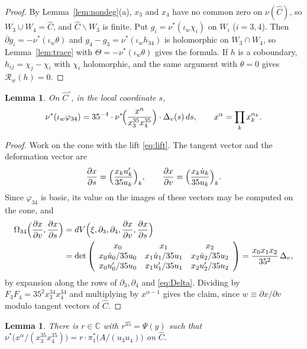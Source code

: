 \documentclass[11pt]{amsart}
\newtheorem{lemma}[theorem]{Lemma}
\theoremstyle{definition}
\theoremstyle{remark}
\numberwithin{equation}{section}
\newcommand{\C}{\mathbb{C}}
\newcommand{\cR}{\mathcal{R}}
\newcommand{\Ob}{\overline{\partial}}
\newcommand{\sm}{\smallsetminus}
\begin{document}
\begin{proof}
By Lemma~\ref{lem:nondeg}(a), $x_3$ and $x_4$ have no common zero on $\nu(\widehat C)$, so $W_3\cup W_4=\widehat C$, and $\widehat C\sm W_3$ is finite. Put $g_i=\nu^*(\iota_w\chi_i)$ on $W_i$ ($i=3,4$). Then $\Ob g_i=-\nu^*(\iota_w\theta)$ and $g_4-g_3=\nu^*(\iota_wh_{34})$ is holomorphic on $W_3\cap W_4$, so Lemma~\ref{lem:trace} with $\Theta=-\nu^*(\iota_w\theta)$ gives the formula. If $h$ is a coboundary, $h_{ij}=\chi_j-\chi_i$ with $\chi_i$ holomorphic, and the same argument with $\theta=0$ gives $\cR_w(h)=0$.
\end{proof}

\begin{lemma}\label{lem:contraction}
On $\widehat C^\circ$, in the local coordinate $s$,
\[
\nu^*(\iota_w\varphi_{34})=35^{-4}\cdot\nu^*\!\Bigl(\frac{x^\alpha}{x_3^{35}x_4^{35}}\Bigr)\cdot\Delta_v(s)\,ds,\qquad x^\alpha=\prod_kx_k^{\alpha_k}.
\]
\end{lemma}

\begin{proof}
Work on the cone with the lift \eqref{eq:lift}. The tangent vector and the deformation vector are
\[
\frac{\partial x}{\partial s}=\Bigl(\frac{x_ku_k'}{35u_k}\Bigr)_k,\qquad \frac{\partial x}{\partial v}=\Bigl(\frac{x_k\dot u_k}{35u_k}\Bigr)_k .
\]
Since $\varphi_{34}$ is basic, its value on the images of these vectors may be computed on the cone, and
\begin{align*}
\Omega_{34}\Bigl(\frac{\partial x}{\partial v},\frac{\partial x}{\partial s}\Bigr)&=dV\Bigl(\xi,\partial_3,\partial_4,\frac{\partial x}{\partial v},\frac{\partial x}{\partial s}\Bigr)\\
&=\det\left(\begin{array}{ccc}x_0&x_1&x_2\\ x_0\dot u_0/35u_0&x_1\dot u_1/35u_1&x_2\dot u_2/35u_2\\ x_0u_0'/35u_0&x_1u_1'/35u_1&x_2u_2'/35u_2\end{array}\right)=\frac{x_0x_1x_2}{35^2}\,\Delta_v,
\end{align*}
by expansion along the rows of $\partial_3,\partial_4$ and \eqref{eq:Delta}. Dividing by $F_3F_4=35^2x_3^{34}x_4^{34}$ and multiplying by $x^{\alpha-1}$ gives the claim, since $w\equiv\partial x/\partial v$ modulo tangent vectors of $\widehat C$.
\end{proof}

\begin{lemma}\label{lem:r}
There is $r\in\C$ with $r^{35}=\Psi(y)$ such that $\nu^*\bigl(x^\alpha/(x_3^{35}x_4^{35})\bigr)=r\cdot\pi_1^*\bigl(A/(u_3u_4)\bigr)$ on $\widehat C$.
\end{lemma}
\end{document}
